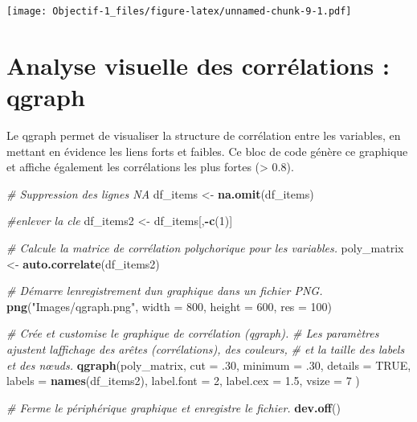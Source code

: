 \documentclass[
]{article}
\newenvironment{Shaded}{\begin{snugshade}}{\end{snugshade}}
\newcommand{\AttributeTok}[1]{\textcolor[rgb]{0.13,0.29,0.53}{#1}}
\newcommand{\CommentTok}[1]{\textcolor[rgb]{0.56,0.35,0.01}{\textit{#1}}}
\newcommand{\ConstantTok}[1]{\textcolor[rgb]{0.56,0.35,0.01}{#1}}
\newcommand{\DecValTok}[1]{\textcolor[rgb]{0.00,0.00,0.81}{#1}}
\newcommand{\FloatTok}[1]{\textcolor[rgb]{0.00,0.00,0.81}{#1}}
\newcommand{\FunctionTok}[1]{\textcolor[rgb]{0.13,0.29,0.53}{\textbf{#1}}}
\newcommand{\NormalTok}[1]{#1}
\newcommand{\OtherTok}[1]{\textcolor[rgb]{0.56,0.35,0.01}{#1}}
\newcommand{\SpecialCharTok}[1]{\textcolor[rgb]{0.81,0.36,0.00}{\textbf{#1}}}
\newcommand{\StringTok}[1]{\textcolor[rgb]{0.31,0.60,0.02}{#1}}
\begin{document}
\texttt{[image: Objectif-1\_files/figure-latex/unnamed-chunk-9-1.pdf]}

\section{Analyse visuelle des corrélations :
qgraph}\label{analyse-visuelle-des-corruxe9lations-qgraph}

Le qgraph permet de visualiser la structure de corrélation entre les
variables, en mettant en évidence les liens forts et faibles. Ce bloc de
code génère ce graphique et affiche également les corrélations les plus
fortes (\textgreater{} 0.8).

\begin{Shaded}
\begin{Highlighting}[]
\CommentTok{\# Suppression des lignes NA}
\NormalTok{df\_items }\OtherTok{\textless{}{-}} \FunctionTok{na.omit}\NormalTok{(df\_items)}

\CommentTok{\#enlever la cle}
\NormalTok{df\_items2 }\OtherTok{\textless{}{-}}\NormalTok{ df\_items[,}\SpecialCharTok{{-}}\FunctionTok{c}\NormalTok{(}\DecValTok{1}\NormalTok{)]}

\CommentTok{\# Calcule la matrice de corrélation polychorique pour les variables.}
\NormalTok{poly\_matrix }\OtherTok{\textless{}{-}} \FunctionTok{auto.correlate}\NormalTok{(df\_items2)}

\CommentTok{\# Démarre l\textquotesingle{}enregistrement d\textquotesingle{}un graphique dans un fichier PNG.}
\FunctionTok{png}\NormalTok{(}\StringTok{"Images/qgraph.png"}\NormalTok{, }\AttributeTok{width =} \DecValTok{800}\NormalTok{, }\AttributeTok{height =} \DecValTok{600}\NormalTok{, }\AttributeTok{res =} \DecValTok{100}\NormalTok{)}

\CommentTok{\# Crée et customise le graphique de corrélation (qgraph).}
\CommentTok{\# Les paramètres ajustent l\textquotesingle{}affichage des arêtes (corrélations), des couleurs,}
\CommentTok{\# et la taille des labels et des nœuds.}
\FunctionTok{qgraph}\NormalTok{(poly\_matrix,}
       \AttributeTok{cut =}\NormalTok{ .}\DecValTok{30}\NormalTok{,}
       \AttributeTok{minimum =}\NormalTok{ .}\DecValTok{30}\NormalTok{,}
       \AttributeTok{details =} \ConstantTok{TRUE}\NormalTok{,}
       \AttributeTok{labels =} \FunctionTok{names}\NormalTok{(df\_items2),}
       \AttributeTok{label.font =} \DecValTok{2}\NormalTok{,}
       \AttributeTok{label.cex =} \FloatTok{1.5}\NormalTok{,}
       \AttributeTok{vsize =} \DecValTok{7}
\NormalTok{)}

\CommentTok{\# Ferme le périphérique graphique et enregistre le fichier.}
\FunctionTok{dev.off}\NormalTok{()}
\end{Highlighting}
\end{Shaded}
\end{document}
